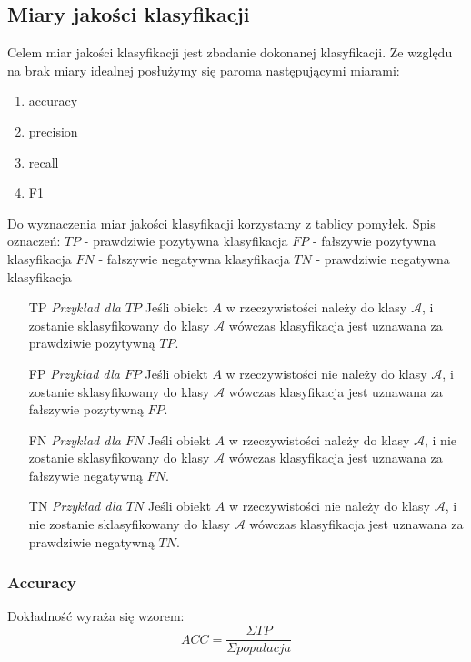 \documentclass{classrep}
\begin{document}
\subsection{Miary jakości klasyfikacji}
Celem miar jakości klasyfikacji jest zbadanie dokonanej klasyfikacji. Ze względu na brak miary idealnej posłużymy się paroma następującymi miarami:
\begin{enumerate}
\item{accuracy}
\item{precision}
\item{recall}
\item{F1}
\end{enumerate}
Do wyznaczenia miar jakości klasyfikacji korzystamy z tablicy pomyłek. Spis oznaczeń:
\newline $TP$ - prawdziwie pozytywna klasyfikacja
\newline $FP$ - fałszywie pozytywna klasyfikacja
\newline $FN$ - fałszywie negatywna klasyfikacja
\newline $TN$ - prawdziwie negatywna klasyfikacja
\newline
\begin{enumerate}
\item[TP]{\textit{Przykład dla $TP$} Jeśli obiekt $A$ w rzeczywistości należy do klasy $\mathcal{A}$, i zostanie sklasyfikowany do klasy $\mathcal{A}$ wówczas klasyfikacja jest uznawana za prawdziwie pozytywną $TP$.}
\item[FP]{\textit{Przykład dla $FP$} Jeśli obiekt $A$ w rzeczywistości nie należy do klasy $\mathcal{A}$, i zostanie sklasyfikowany do klasy $\mathcal{A}$ wówczas klasyfikacja jest uznawana za fałszywie pozytywną $FP$.}
\item[FN]{\textit{Przykład dla $FN$} Jeśli obiekt $A$ w rzeczywistości należy do klasy $\mathcal{A}$, i nie zostanie sklasyfikowany do klasy $\mathcal{A}$ wówczas klasyfikacja jest uznawana za fałszywie negatywną $FN$.}
\item[TN]{\textit{Przykład dla $TN$} Jeśli obiekt $A$ w rzeczywistości nie należy do klasy $\mathcal{A}$, i nie zostanie sklasyfikowany do klasy $\mathcal{A}$ wówczas klasyfikacja jest uznawana za prawdziwie negatywną $TN$.}
\end{enumerate}


\subsubsection{Accuracy}
Dokładność wyraża się wzorem:
\begin{equation}
ACC=\frac{\Sigma TP}{\Sigma populacja} \label{eq:eps}
\end{equation}
\end{document}
